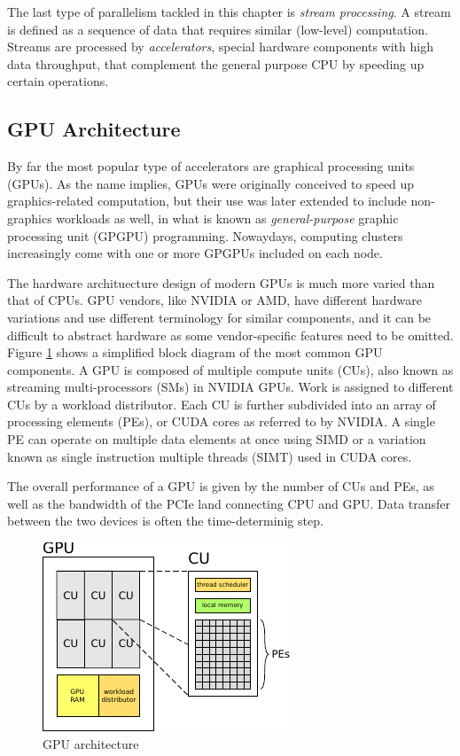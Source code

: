 The last type of parallelism tackled in this chapter is \emph{stream processing}. A stream is defined as a sequence of data that requires similar (low-level) computation. Streams are processed by \emph{accelerators}, special hardware components with high data throughput, that complement the general purpose CPU by speeding up certain operations. 

\subsection{GPU Architecture}

By far the most popular type of accelerators are graphical processing units (GPUs). As the name implies, GPUs were originally conceived to speed up graphics-related computation, but their use was later extended to include non-graphics workloads as well, in what is known as \emph{general-purpose} graphic processing unit (GPGPU) programming. Nowaydays, computing clusters increasingly come with one or more GPGPUs included on each node.

The hardware archituecture design of modern GPUs is much more varied than that of CPUs. GPU vendors, like NVIDIA or AMD, have different hardware variations and use different terminology for similar components, and it can be difficult to abstract hardware as some vendor-specific features need to be omitted. Figure \ref{fig:gpu} shows a simplified block diagram of the most common GPU components. A GPU is composed of multiple compute units (CUs), also known as streaming multi-processors (SMs) in NVIDIA GPUs. Work is assigned to different CUs by a workload distributor. Each CU is further subdivided into an array of processing elements (PEs), or CUDA cores as referred to by NVIDIA. A single PE can operate on multiple data elements at once using SIMD or a variation known as single instruction multiple threads (SIMT) used in CUDA cores.

The overall performance of a GPU is given by the number of CUs and PEs, as well as the bandwidth of the PCIe land connecting CPU and GPU. Data transfer between the two devices is often the time-determinig step.

\begin{figure}
\centering
\includegraphics[scale=2.0]{Pics/gpu}
\caption{GPU architecture}
\label{fig:gpu}
\end{figure}

